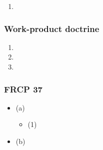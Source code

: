 \begin{enumerate}
    \item %
\end{enumerate}

\subsubsection{Work-product doctrine}

\begin{enumerate}
    \item %
    \item %
    \item %
\end{enumerate}


\subsubsection{FRCP 37}

\begin{itemize}
    \item (a) %
    \begin{itemize}
        \item (1) %
    \end{itemize}
    \item (b) %
\end{itemize}

